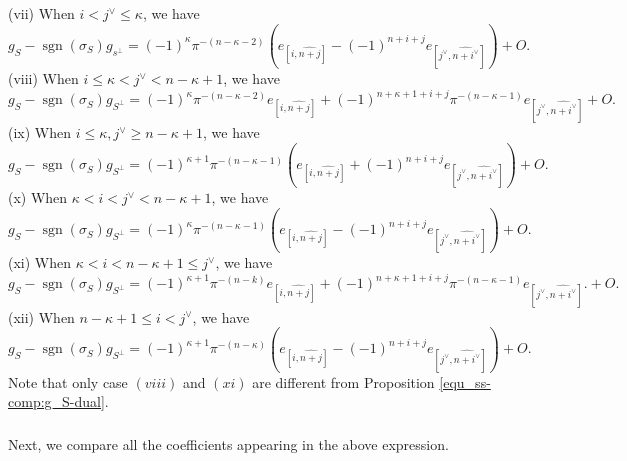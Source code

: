 \documentclass[pdflatex,sn-mathphys-num]{sn-jnl}%
\theoremstyle{thmstyleone}%
\theoremstyle{thmstyletwo}%
\numberwithin{equation}{subsection}
\theoremstyle{thmstylethree}%
\DeclareMathOperator{\sgn}{sgn}
\newcommand{\wh}{\widehat}
\begin{document}
\noindent (vii) When $i<j^\vee\leq \kappa$, we have
\[
	g_S-\sgn(\sigma_S)g_{s^\perp}=(-1)^\kappa\pi^{-(n-\kappa-2)}
	\left(
	e_{[i,\wh{n+j}]}-(-1)^{n+i+j}e_{[j^\vee,\wh{n+i^\vee}]}
	\right)+O.
\]
\noindent (viii) When $i\leq \kappa<j^\vee<n-\kappa+1$, we have
\[
    g_S-\sgn(\sigma_S)g_{S^\perp}=
	(-1)^\kappa\pi^{-(n-\kappa-2)}e_{[i,\wh{n+j}]}+
	(-1)^{n+\kappa+1+i+j}\pi^{-(n-\kappa-1)}e_{[j^\vee,\wh{n+i^\vee}]}+O.
\]
\noindent (ix) When $i\leq \kappa,j^\vee\geq n-\kappa+1$, we have
\[
	g_S-\sgn(\sigma_S)g_{S^\perp}=(-1)^{\kappa+1}\pi^{-(n-\kappa-1)}
	\left(
	e_{[i,\wh{n+j}]}+(-1)^{n+i+j}e_{[j^\vee,\wh{n+i^\vee}]}
	\right)+O.
\]
(x) When $\kappa<i<j^\vee<n-\kappa+1$, we have
\[
	g_S-\sgn(\sigma_S)g_{S^\perp}=
	(-1)^\kappa\pi^{-(n-\kappa-1)}
	\left( 
	e_{[i,\wh{n+j}]}-(-1)^{n+i+j}e_{[j^\vee,\wh{n+i^\vee}]}
	\right)+O.
\]
\noindent (xi) When $\kappa<i<n-\kappa+1\leq j^\vee$, we have
\[
	g_S-\sgn(\sigma_S)g_{S^\perp}
	=(-1)^{\kappa+1}\pi^{-(n-k)}e_{[i,\wh{n+j}]}
	+(-1)^{n+\kappa+1+i+j}\pi^{-(n-\kappa-1)}e_{[j^\vee,\wh{n+i^\vee}]}.
	+O.
\]
\noindent (xii) When $n-\kappa+1\leq i<j^\vee$, we have
\[
	g_S-\sgn(\sigma_S)g_{S^\perp}=(-1)^{\kappa+1}\pi^{-(n-\kappa)}\left(
	e_{[i,\wh{n+j}]}-(-1)^{n+i+j}e_{[j^\vee,\wh{n+i^\vee}]}
	\right)+O.
\]
Note that only case $(viii)$ and $(xi)$ are different from Proposition \ref{equ_ss-comp:g_S-dual}.
			


\subsubsection{}
Next, we compare all the coefficients appearing in the above expression.
			
\end{document}
